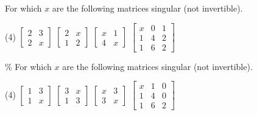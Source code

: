 \documentclass{ximera}
\begin{document}
\begin{exercise}
    For which $x$ are the following matrices singular (not invertible).
    \begin{tasks}(4)
        \task
        $\begin{bmatrix}
            2 & 3 \\
            2 & x
        \end{bmatrix}$
        \task
        $\begin{bmatrix}
            2 & x \\
            1 & 2
        \end{bmatrix}$
        \task
        $\begin{bmatrix}
            x & 1 \\
            4 & x
        \end{bmatrix}$
        \task
        $\begin{bmatrix}
            x & 0 & 1 \\
            1 & 4 & 2 \\
            1 & 6 & 2
        \end{bmatrix}$
    \end{tasks}
\end{exercise}

\begin{exercise}\%
    For which $x$ are the following matrices singular (not invertible).
    \begin{tasks}(4)
        \task
        $\begin{bmatrix}
            1 & 3 \\
            1 & x
        \end{bmatrix}$
        \task
        $\begin{bmatrix}
            3 & x \\
            1 & 3
        \end{bmatrix}$
        \task
        $\begin{bmatrix}
            x & 3 \\
            3 & x
        \end{bmatrix}$
        \task
        $\begin{bmatrix}
            x & 1 & 0 \\
            1 & 4 & 0 \\
            1 & 6 & 2
        \end{bmatrix}$
    \end{tasks}
\end{exercise}
\end{document}
